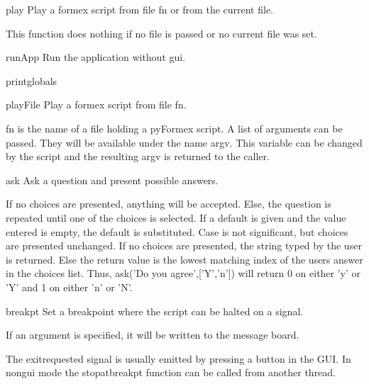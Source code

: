 \begin{funcdesc}{play}{}
Play a formex script from file fn or from the current file.

    This function does nothing if no file is passed or no current
    file was set.
    

\end{funcdesc}


\begin{funcdesc}{runApp}{}
Run the application without gui.

\end{funcdesc}


\begin{funcdesc}{printglobals}{}


\end{funcdesc}


\begin{funcdesc}{playFile}{}
Play a formex script from file fn.

    fn is the name of a file holding a pyFormex script.
    A list of arguments can be passed. They will be available under the name
    argv. This variable can be changed by the script and the resulting argv
    is returned to the caller.
    

\end{funcdesc}


\begin{funcdesc}{ask}{}
Ask a question and present possible answers.

    If no choices are presented, anything will be accepted.
    Else, the question is repeated until one of the choices is selected.
    If a default is given and the value entered is empty, the default is
    substituted.
    Case is not significant, but choices are presented unchanged.
    If no choices are presented, the string typed by the user is returned.
    Else the return value is the lowest matching index of the users answer
    in the choices list. Thus, ask('Do you agree',['Y','n']) will return
    0 on either 'y' or 'Y' and 1 on either 'n' or 'N'.
    

\end{funcdesc}


\begin{funcdesc}{breakpt}{}
Set a breakpoint where the script can be halted on a signal.

    If an argument is specified, it will be written to the message board.

    The exitrequested signal is usually emitted by pressing a button in the GUI.
    In nongui mode the stopatbreakpt function can be called from another thread.
    

\end{funcdesc}


